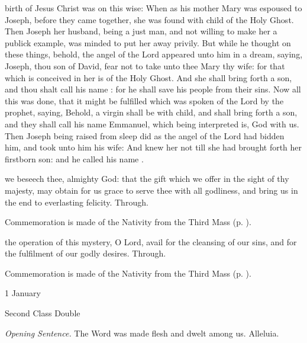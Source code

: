  birth of Jesus Christ was on this wise: When as his mother Mary was espoused to Joseph, before they came together, she was found with child of the Holy Ghost. Then Joseph her husband, being a just man, and not willing to make her a publick example, was minded to put her away privily. But while he thought on these things, behold, the angel of the Lord appeared unto him in a dream, saying, Joseph, thou son of David, fear not to take unto thee Mary thy wife: for that which is conceived in her is of the Holy Ghost. And she shall bring forth a son, and thou shalt call his name : for he shall save his people from their sins. Now all this was done, that it might be fulfilled which was spoken of the Lord by the prophet, saying, Behold, a virgin shall be with child, and shall bring forth a son, and they shall call his name Emmanuel, which being interpreted is, God with us. Then Joseph being raised from sleep did as the angel of the Lord had bidden him, and took unto him his wife: And knew her not till she had brought forth her firstborn son: and he called his name .

\secret
{} we beseech thee, almighty God: that the gift which we offer in the sight of thy majesty, may obtain for us grace to serve thee with all godliness, and bring us in the end to everlasting felicity. Through.
\begin{rubric}
    Commemoration is made of the Nativity from the Third Mass (p. \pageref{NativityMassIIISecret}).
\end{rubric}
\postcommunion
{} the operation of this mystery, O Lord, avail for the cleansing of our sins, and for the fulfilment of our godly desires. Through.
\begin{rubric}
    Commemoration is made of the Nativity from the Third Mass (p. \pageref{NativityMassIIIPostcommunion}).
\end{rubric}

\begin{inhead}
{1 January}\par
{Second Class Double}
\end{inhead}
\par\noindent
\textit{Opening Sentence.} The Word was made flesh and dwelt among us. Alleluia.

